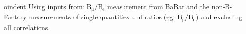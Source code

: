 
oindent Using inputs from: $\mathrm{B_\mu/B_e}$ measurement from BaBar and the non-B-Factory measurements of single quantities and ratios (eg. $\mathrm{B_\mu/B_e}$) and excluding all correlations.
